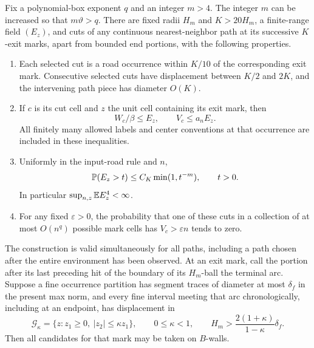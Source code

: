 \begin{lemma}\label{access:selected-cuts}
Fix a polynomial-box exponent $q$ and an integer $m>4$.  The integer $m$
can be increased so that $m\vartheta>q$. There are fixed radii $H_m$ and
$K>20H_m$, a finite-range field $(E_z)$, and cuts of any
continuous nearest-neighbor path at its successive $K$-exit marks, apart
from bounded end portions, with the following properties.
\begin{enumerate}
\item Each selected cut is a road occurrence within $K/10$ of the
corresponding exit mark.  Consecutive selected cuts have displacement
between $K/2$ and $2K$, and the intervening path piece has diameter $O(K)$.
\item If $c$ is its cut cell and $z$ the unit cell containing its exit
mark, then
\begin{equation}\label{access:cut-control}
             W_c/\beta\le E_z,\qquad V_c\le a_n E_z.
\end{equation}
All finitely many allowed labels and center conventions at that
occurrence are included in these inequalities.
\item Uniformly in the input-road rule and $n$,
\begin{equation}\label{access:cut-tail}
        \mathbb P(E_z>t)\le C_K\min(1,t^{-m}),\qquad t>0.
\end{equation}
In particular $\sup_{n,z}\mathbb E E_z^4<\infty$.
\item For any fixed $\varepsilon>0$, the probability that one of these
cuts in a collection of at most $O(n^q)$ possible mark cells has
$V_c>\varepsilon n$ tends to zero.
\end{enumerate}
The construction is valid simultaneously for all paths, including a path
chosen after the entire environment has been observed. At an exit mark,
call the portion after its last preceding hit of the boundary of its
$H_m$-ball the terminal arc. Suppose a fine occurrence partition has
segment traces of diameter at most $\delta_f$ in the present max norm,
and every fine interval meeting that arc chronologically, including at
an endpoint, has displacement in
\begin{equation}\label{access:horizontal-hyp}
 \mathcal G_\kappa=\{z:z_1\ge0,\ |z_2|\le\kappa z_1\},
 \qquad 0\le\kappa<1,
 \qquad H_m>\frac{2(1+\kappa)}{1-\kappa}\delta_f.
\end{equation}
Then all candidates for that mark may be taken on $B$-walls.
\end{lemma}

